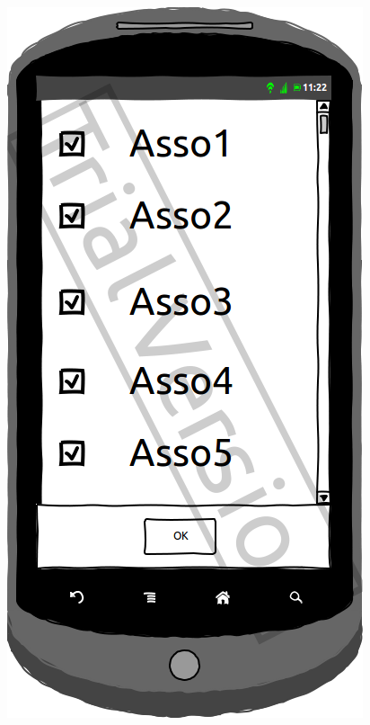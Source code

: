 \documentclass[a4paper, 11px]{article}
\begin{document}
\begin{figure}[htbp]
\begin{minipage}[c]{.33\linewidth}
	\end{minipage}
	\hfill
	\begin{minipage}[c]{.33\linewidth}
		\begin{center}
			\includegraphics[scale=0.3]{../../Sketch/Android/Filtre.png}
		\end{center}
	\end{minipage}
	\hfill
	\begin{minipage}[c]{.32\linewidth}
		\begin{center}

\end{center}
\end{minipage}
\end{figure}
\end{document}
